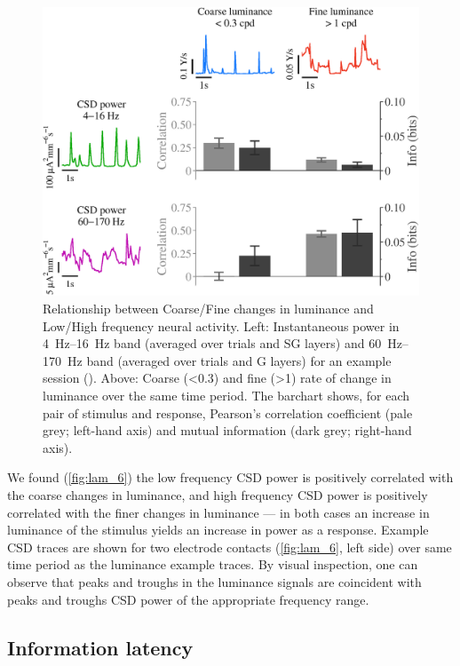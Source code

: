 \begin{figure}[htbp]
\centering \includegraphics[scale=.5]{paperfigs/fig6A.eps}
%
\caption{
Relationship between Coarse/Fine changes in luminance and Low/High frequency neural activity.
Left: Instantaneous power in \SIrange{4}{16}{Hz} band (averaged over trials and \ac{SG} layers) and \SIrange{60}{170}{Hz} band (averaged over trials and \ac{G} layers) for an example session ().
Above: Coarse (\SI{<0.3}{\cpd}) and fine (\SI{>1}{\cpd}) rate of change in luminance over the same time period.
The barchart shows, for each pair of stimulus and response, Pearson's correlation coefficient (pale grey; left-hand axis) and mutual information (dark grey; right-hand axis).
}%
\label{fig:lam_6}
%
\end{figure}

We found (\autoref{fig:lam_6}) the low frequency \ac{CSD} power is positively correlated with the coarse changes in luminance, and high frequency \ac{CSD} power is positively correlated with the finer changes in luminance --- in both cases an increase in luminance of the stimulus yields an increase in power as a response.
Example \ac{CSD} traces are shown for two electrode contacts (\autoref{fig:lam_6}, left side) over same time period as the luminance example traces.
By visual inspection, one can observe that peaks and troughs in the luminance signals are coincident with peaks and troughs \ac{CSD} power of the appropriate frequency range.


\subsection{Information latency}


